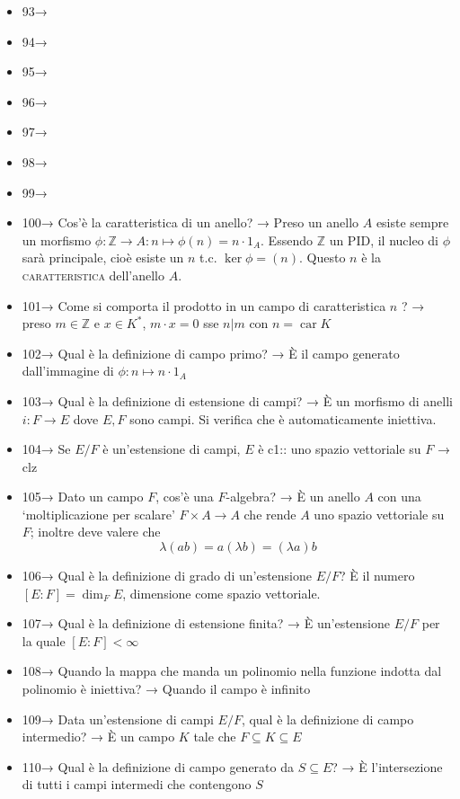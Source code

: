 \documentclass[A4,12pt]{article}
\newcommand{\Z}{\mathbb{Z}}
\renewcommand{\subset}{\subseteq}
\begin{document}
\begin{itemize}[noitemsep]
		\item 93→ 
		\item 94→ 
		\item 95→ 
		\item 96→ 
		\item 97→ 
		\item 98→ 
		\item 99→ 
		\item 100→ Cos'è la caratteristica di un anello? → Preso un anello $ A $ esiste sempre un morfismo $ \phi:\Z \to A: n\mapsto \phi(n) = n\cdot 1_A $. Essendo $ \Z $ un PID, il nucleo di $ \phi $ sarà principale, cioè esiste un $ n $ t.c. $ \ker\phi= (n) $. Questo $ n $ è la \textsc{caratteristica} dell'anello $ A $.
		\item 101→ Come si comporta il prodotto in un campo di caratteristica $ n $ ? → preso $ m\in \Z $ e $ x\in K^* $, $ m\cdot x  = 0$ sse $ n|m $ con $ n = \operatorname{car}K$ 
		\item 102→ Qual è la definizione di campo primo? → È il campo generato dall'immagine di $ \phi:n\mapsto n\cdot 1_A $
		\item 103→ Qual è la definizione di estensione di campi? → È un morfismo di anelli $ i:F\to E $ dove $ E,F $ sono campi. Si verifica che è automaticamente iniettiva.
		\item 104→ Se $ E/F $ è un'estensione di campi, $ E $ è {{c1:: uno spazio vettoriale su }} $ F $ → clz
		\item 105→ Dato un campo $ F $, cos'è una $ F $-algebra? → È un anello $ A $ con una \enquote*{moltiplicazione per scalare} $ F\times A\to A $ che rende $ A $ uno spazio vettoriale su $ F $; inoltre deve valere che \[\lambda(ab)=a(\lambda b) = (\lambda a)b\]
		\item 106→ Qual è la definizione di grado di un'estensione $ E/F $? È il numero $ [E:F] = \dim_F E$, dimensione come spazio vettoriale.
		\item 107→ Qual è la definizione di estensione finita? → È un'estensione $ E/F $ per la quale $ [E:F]<\infty$
		\item 108→ Quando la mappa che manda un polinomio nella funzione indotta dal polinomio è iniettiva? → Quando il campo è infinito
		\item 109→ Data un'estensione di campi $ E/F $, qual è la definizione di campo intermedio? → È un campo $ K $ tale che $ F\subset K\subset E $
		\item 110→ Qual è la definizione di campo generato da $ S\subset E $? → È l'intersezione di tutti i campi intermedi che contengono $ S $

\end{itemize}
\end{document}
